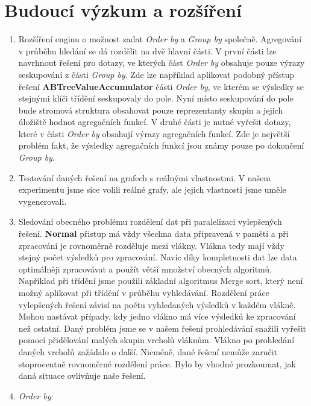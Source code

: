 \section*{Budoucí výzkum a rozšíření}

\begin{enumerate}

\item 
Rozšíření enginu o možnost zadat \textit{Order by} a \textit{Group by} společně.
Agregování v průběhu hledání se dá rozdělit na dvě hlavní části.
V první části lze navrhnout řešení pro dotazy, ve kterých část \textit{Order by} obsahuje pouze výrazy seskupování z části \textit{Group by}.
Zde lze například aplikovat podobný přístup řešení \textbf{ABTreeValueAccumulator} části \textit{Order by}, ve kterém se výsledky se stejnými klíči třídění seskupovaly do pole.
Nyní místo seskupování do pole bude stromová struktura obsahovat pouze reprezentanty skupin a jejich úložiště hodnot agregačních funkcí.
V druhé části je nutné vyřešit dotazy, které v části \textit{Order by} obsahují výrazy agregačních funkcí.
Zde je největší problém fakt, že výsledky agregačních funkcí jsou známy pouze po dokončení \textit{Group by}.

\item Testování daných řešení na grafech s reálnými vlastnostmi.
V našem experimentu jsme sice volili reálné grafy, ale jejich vlastnosti jsme uměle vygenerovali.

\item Sledování obecného problému rozdělení dat při paralelizaci vylepšených řešení. 
\textbf{Normal} přistup má vždy všechna data připravená v paměti a při zpracování je rovnoměrně rozděluje mezi vlákny.
Vlákna tedy mají vždy stejný počet výsledků pro zpracování.
Navíc díky kompletnosti dat lze data optimálněji zpracovávat a použít větší množství obecných algoritmů.
Například při třídění jsme použili základní algoritmus Merge sort, který není možný aplikovat při třídění v průběhu vyhledávání.  
Rozdělení práce vylepšených řešení závisí na počtu vyhledaných výsledků v každém vlákně.
Mohou nastávat případy, kdy jedno vlákno má více výsledků ke zpracování než ostatní. 
Daný problém jsme se v našem řešení prohledávání snažili vyřešit pomocí přidělování malých skupin vrcholů vláknům.
Vlákno po prohledání daných vrcholů zažádalo o další.
Nicméně, dané řešení nemůže zaručit stoprocentně rovnoměrné rozdělení práce.
Bylo by vhodné prozkoumat, jak daná situace ovlivňuje naše řešení.

\item \textit{Order by}:
\begin{enumerate}


\end{enumerate}
\end{enumerate}
